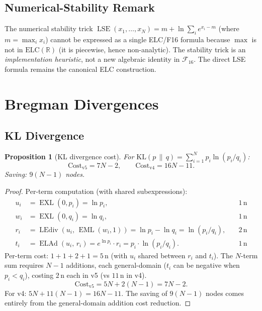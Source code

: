 \documentclass[12pt,a4paper]{article}
\newtheorem{proposition}[theorem]{Proposition}
\theoremstyle{definition}
\newcommand{\EML}{\operatorname{EML}}
\newcommand{\EXL}{\operatorname{EXL}}
\newcommand{\ELAd}{\operatorname{ELAd}}
\newcommand{\LEdiv}{\operatorname{LEdiv}}
\newcommand{\Cost}{\mathrm{Cost}}
\newcommand{\LSE}{\operatorname{LSE}}
\newcommand{\F}{\mathcal{F}_{16}}
\newcommand{\R}{\mathbb{R}}
\begin{document}
\subsection{Numerical-Stability Remark}

The numerical stability trick $\LSE(x_1,\ldots,x_N) = m + \ln\sum_i e^{x_i - m}$
(where $m = \max_i x_i$) cannot be expressed as a single ELC/F16 formula because
$\max$ is not in $\mathrm{ELC}(\R)$ (it is piecewise, hence non-analytic).
The stability trick is an \emph{implementation heuristic}, not a new algebraic
identity in $\F$.  The direct LSE formula remains the canonical ELC construction.

\section{Bregman Divergences}
\label{sec:bregman}

\subsection{KL Divergence}

\begin{proposition}[KL divergence cost]
\label{prop:kl}
For $\mathrm{KL}(p\,\|\,q) = \sum_{i=1}^{N} p_i \ln(p_i/q_i)$:
\[
  \Cost_{\mathrm{v5}} = 7N - 2, \qquad
  \Cost_{\mathrm{v4}} = 16N - 11.
\]
Saving: $9(N-1)$ nodes.
\end{proposition}

\begin{proof}
Per-term computation (with shared subexpressions):
\begin{align*}
  u_i  &= \EXL(0,p_i) = \ln p_i,   \quad &1\,\text{n} \\
  w_i  &= \EXL(0,q_i) = \ln q_i,   \quad &1\,\text{n} \\
  r_i  &= \LEdiv(u_i,\,\EML(w_i,1)) = \ln p_i - \ln q_i = \ln(p_i/q_i), \quad &2\,\text{n} \\
  t_i  &= \ELAd(u_i,\,r_i) = e^{\ln p_i} \cdot r_i = p_i \cdot \ln(p_i/q_i). \quad &1\,\text{n}
\end{align*}
Per-term cost: $1 + 1 + 2 + 1 = 5\,\text{n}$ (with $u_i$ shared between $r_i$ and $t_i$).
The $N$-term sum requires $N - 1$ additions, each general-domain ($t_i$ can be
negative when $p_i < q_i$), costing $2\,\text{n}$ each in v5 (vs $11\,\text{n}$
in v4).
\[
  \Cost_{\mathrm{v5}} = 5N + 2(N-1) = 7N - 2.
\]
For v4: $5N + 11(N-1) = 16N - 11$.
The saving of $9(N-1)$ nodes comes entirely from the general-domain addition
cost reduction.
\end{proof}
\end{document}
